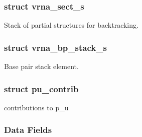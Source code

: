 \subsubsection{struct vrna\+\_\+sect\+\_\+s}
Stack of partial structures for backtracking. \label{structvrna__bp__stack__s}
\subsubsection{struct vrna\+\_\+bp\+\_\+stack\+\_\+s}
Base pair stack element. \label{structpu__contrib}
\subsubsection{struct pu\+\_\+contrib}
contributions to p\+\_\+u \subsubsection*{Data Fields}
